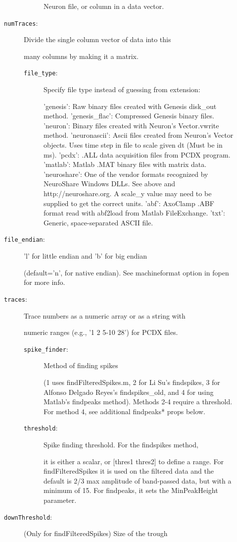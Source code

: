 \begin{description}
\begin{description}
\begin{description}
Neuron file, or column in a data vector.
\end{description}%
\item[\texttt{numTraces}:]
 Divide the single column vector of data into this

many columns by making it a matrix.
\begin{description}%
\item[\texttt{file\_type}:]
 Specify file type instead of guessing from extension:

'genesis': Raw binary files created with Genesis disk\_out method.
'genesis\_flac': Compressed Genesis binary files.
'neuron': Binary files created with Neuron's Vector.vwrite method.
'neuronascii': Ascii files created from Neuron's Vector objects. 
Uses time step in file to scale given dt (Must be in ms).
'pcdx': .ALL data acquisition files from PCDX program.
'matlab': Matlab .MAT binary files with matrix data.
'neuroshare': One of the vendor formats recognized by
NeuroShare Windows DLLs. See above and http://neuroshare.org. A
scale\_y value may need to be supplied to get the correct units.
'abf': AxoClamp .ABF format read with abf2load from
Matlab FileExchange.
'txt': Generic, space-separated ASCII file.
\end{description}%
\item[\texttt{file\_endian}:]
 'l' for little endian and 'b' for big endian

(default='n', for native endian). See machineformat option 
in fopen for more info.
\item[\texttt{traces}:]
 Trace numbers as a numeric array or as a string with

numeric ranges (e.g., '1 2 5-10 28') for PCDX files.
\begin{description}%
\item[\texttt{spike\_finder}:]
 Method of finding spikes 

(1 uses findFilteredSpikes.m, 2 for Li Su's
findspikes, 3 for Alfonso Delgado Reyes's 
findspikes\_old, and 4 for using Matlab's
findpeaks method). Methods 2-4 require a
threshold. For method 4, see additional findpeaks*
props below.
\item[\texttt{threshold}:]
 Spike finding threshold. For the findspikes method,

it is either a scalar, or [thres1 thres2] to define
a range. For findFilteredSpikes it is used on the
filtered data and the default is 2/3 max amplitude
of band-passed data, but with a minimum of
15. For findpeaks, it sets the MinPeakHeight parameter.
\end{description}%
\item[\texttt{downThreshold}:]
 (Only for findFilteredSpikes) Size of the trough


\end{description}
\end{description}
